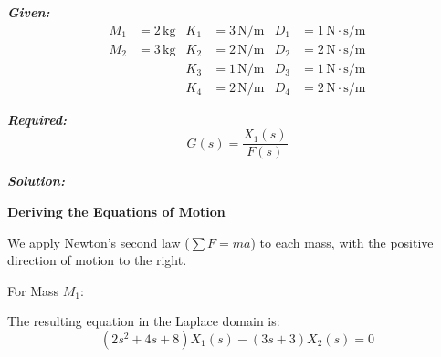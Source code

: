 ﻿\documentclass[11pt]{article}
\begin{document}
\vspace{12pt}

\noindent\textbf{\textit{Given:}}
\[
\begin{aligned}
M_1 &= 2\, \text{kg} & K_1 &= 3\, \text{N/m} & D_1 &= 1\, \text{N}\cdot\text{s/m} \\
M_2 &= 3\, \text{kg} & K_2 &= 2\, \text{N/m} & D_2 &= 2\, \text{N}\cdot\text{s/m} \\
& & K_3 &= 1\, \text{N/m} & D_3 &= 1\, \text{N}\cdot\text{s/m} \\
& & K_4 &= 2\, \text{N/m} & D_4 &= 2\, \text{N}\cdot\text{s/m}
\end{aligned}
\]

\vspace{12pt}

\noindent \textbf{\textit{Required:}}
\[
G(s) = \frac{X_1(s)}{F(s)}
\]

\vspace{12pt}

\noindent \textbf{\textit{Solution:}}

\vspace{12pt}

\noindent \textbf{Deriving the Equations of Motion}
\vspace{12pt}

\noindent We apply Newton's second law ($\sum F = ma$) to each mass, with the positive direction of motion to the right. 

\vspace{12pt}
{For Mass $M_1$:}
\begin{figure}[h!]
\centering
{}
\end{figure}

The resulting equation in the Laplace domain is:
\begin{equation}
(2s^2 + 4s + 8)X_1(s) - (3s + 3)X_2(s) = 0 \tag{1}
\end{equation}
\end{document}

